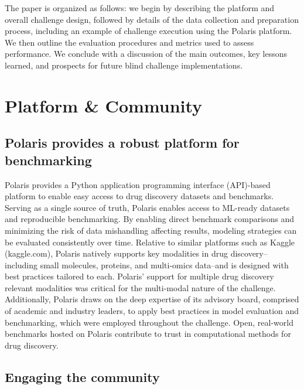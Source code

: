\documentclass[journal=jcim,manuscript=article]{achemso}
\begin{document}
The paper is organized as follows: we begin by describing the platform and overall challenge design, followed by details of the data collection and preparation process, including an example of challenge execution using the Polaris platform. We then outline the evaluation procedures and metrics used to assess performance. We conclude with a discussion of the main outcomes, key lessons learned, and prospects for future blind challenge implementations.

\section{Platform \& Community}

\subsection{Polaris provides a robust platform for benchmarking}

 Polaris provides a Python application programming interface (API)-based platform to enable easy access to drug discovery datasets and benchmarks. Serving as a single source of truth, Polaris enables access to ML-ready datasets and reproducible benchmarking\cite{Polaris_website, wognum_call_2024}. By enabling direct benchmark comparisons and minimizing the risk of data mishandling affecting results, modeling strategies can be evaluated consistently over time. Relative to similar platforms such as Kaggle (kaggle.com), Polaris natively supports key modalities in drug discovery--including small molecules, proteins, and multi-omics data--and is designed with best practices tailored to each. Polaris' support for multiple drug discovery relevant modalities was critical for the multi-modal nature of the challenge.  Additionally, Polaris draws on the deep expertise of its advisory board, comprised of academic and industry leaders, to apply best practices in model evaluation and benchmarking\cite{ash_practically_2024}, which were employed throughout the challenge. Open, real-world benchmarks hosted on Polaris contribute to trust in computational methods for drug discovery.

\subsection{Engaging the community}
\end{document}
